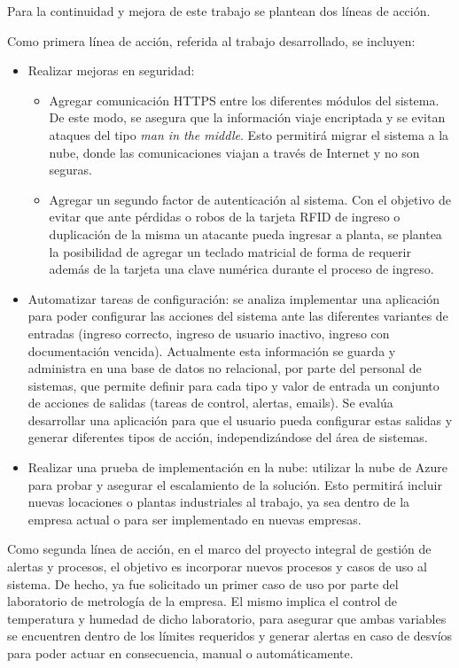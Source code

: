 Para la continuidad y mejora de este trabajo se plantean dos líneas de acción.

Como primera línea de acción, referida al trabajo desarrollado, se incluyen:

\begin{itemize}
\item Realizar mejoras en seguridad:

   \begin{itemize}
      \item Agregar comunicación HTTPS entre los diferentes módulos del sistema. De este modo, se asegura que la información viaje encriptada y se evitan ataques del tipo \textit{man in the middle}. Esto permitirá migrar el sistema a la nube, donde las comunicaciones viajan a través de Internet y no son seguras.
      \item Agregar un segundo factor de autenticación al sistema. Con el objetivo de evitar que ante pérdidas o robos de la tarjeta RFID de ingreso o duplicación de la misma un atacante pueda ingresar a planta, se plantea la posibilidad de agregar un teclado matricial de forma de requerir además de la tarjeta una clave numérica durante el proceso de ingreso.
   \end{itemize}
      
   \item Automatizar tareas de configuración: se analiza implementar una aplicación para poder configurar las acciones del sistema ante las diferentes variantes de entradas (ingreso correcto, ingreso de usuario inactivo, ingreso con documentación vencida). Actualmente esta información se guarda y administra en una base de datos no relacional, por parte del personal de sistemas, que permite definir para cada tipo y valor de entrada un conjunto de acciones de salidas (tareas de control, alertas, emails). Se evalúa desarrollar una aplicación para que el usuario pueda configurar estas salidas y generar diferentes tipos de acción, independizándose del área de sistemas.
   \item Realizar una prueba de implementación en la nube: utilizar la nube de Azure para probar y asegurar el escalamiento de la solución. Esto permitirá incluir nuevas locaciones o plantas industriales al trabajo, ya sea dentro de la empresa actual o para ser implementado en nuevas empresas.
\end{itemize}   

Como segunda línea de acción, en el marco del proyecto integral de gestión de alertas y procesos, el objetivo es incorporar nuevos procesos y casos de uso al sistema. De hecho, ya fue solicitado un primer caso de uso por parte del laboratorio de metrología de la empresa. El mismo implica el control de temperatura y humedad de dicho laboratorio, para asegurar que ambas variables se encuentren dentro de los límites requeridos y generar alertas en caso de desvíos para poder actuar en consecuencia, manual o automáticamente. 
